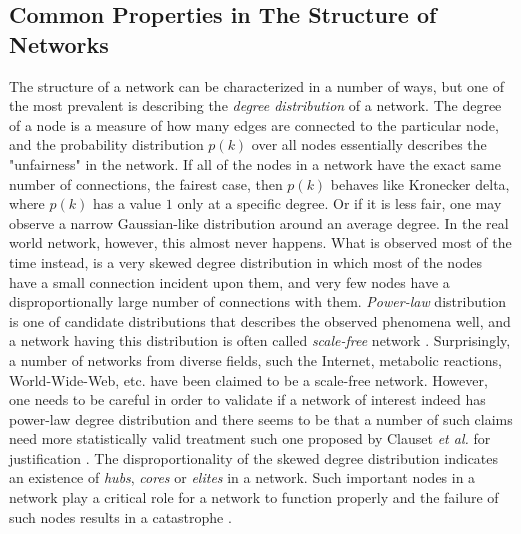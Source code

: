 \documentclass{article}
\begin{document}
	\subsection{Common Properties in The Structure of Networks}
	The structure of a network can be characterized in a number of ways, but one of the most prevalent is describing the \textit{degree distribution} of a network. The degree of a node is a measure of how many edges are connected to the particular node, and the probability distribution $p(k)$ over all nodes essentially describes the "unfairness" in the network. If all of the nodes in a network have the exact same number of connections, the fairest case, then $p(k)$ behaves like Kronecker delta, where $p(k)$ has a value $1$ only at a specific degree. Or if it is less fair, one may observe a narrow Gaussian-like distribution around an average degree. In the real world network, however, this almost never happens. What is observed most of the time instead, is a very skewed degree distribution in which most of the nodes have a small connection incident upon them, and very few nodes have a disproportionally large number of connections with them. \textit{Power-law} distribution is one of candidate distributions that describes the observed phenomena well, and a network having this distribution is often called \textit{scale-free} network \cite{Barabasi99emergenceScaling}. Surprisingly, a number of networks  from diverse fields, such the Internet, metabolic reactions, World-Wide-Web, etc. have been claimed to be a scale-free network. However, one needs to be careful in order to validate if a network of interest indeed has power-law degree distribution and there seems to be that a number of such claims need more statistically valid treatment such one proposed by Clauset \textit{et al.} for justification \cite{Clauset:PowerLaw}. The disproportionality of the skewed degree distribution indicates an existence of  \textit{hubs}, \textit{cores} or \textit{elites} in a network. Such important nodes in a network play a critical role for a network to function properly and the failure of such nodes results in a catastrophe \cite{ScaleFreeAttack}.
	
\end{document}
